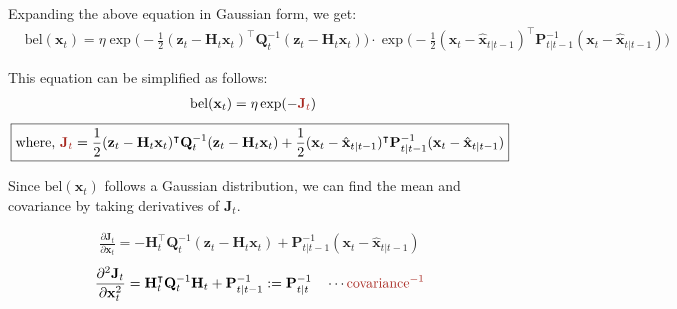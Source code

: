 \documentclass[10pt]{article}
\begin{document}
Expanding the above equation in Gaussian form, we get:
\begin{equation} 
	\begin{aligned} 
		& {\text{bel}}(\mathbf{x}_{t}) = \eta \exp \Big(-\frac{1}{2}(\mathbf{z}_t - \mathbf{H}_t\mathbf{x}_{t})^{\intercal} \mathbf{Q}_t^{-1}(\mathbf{z}_t - \mathbf{H}_t\mathbf{x}_{t}) \Big) \cdot \exp \Big( -\frac{1}{2}(\mathbf{x}_{t} - \hat{\mathbf{x}}_{t|t-1})^{\intercal} {\mathbf{P}}_{t|t-1}^{-1}(\mathbf{x}_{t} - \hat{\mathbf{x}}_{t|t-1}) \Big)
	\end{aligned} 
\end{equation}

This equation can be simplified as follows:
\begin{equation} 
	\begin{aligned} 
		& {\text{bel}}(\mathbf{x}_{t}) = \eta \exp(-{\color{Mahogany} \mathbf{J}_{t} })
	\end{aligned} 
\end{equation}
\begin{equation}
	\boxed{	\begin{aligned}
			\text{where, } {\color{Mahogany} \mathbf{J}_t } = \frac{1}{2}(\mathbf{z}_t - \mathbf{H}_t\mathbf{x}_{t})^{\intercal} \mathbf{Q}_t^{-1}(\mathbf{z}_t - \mathbf{H}_t\mathbf{x}_{t}) + \frac{1}{2}(\mathbf{x}_{t} - \hat{\mathbf{x}}_{t|t-1})^{\intercal} {\mathbf{P}}_{t|t-1}^{-1}(\mathbf{x}_{t} - \hat{\mathbf{x}}_{t|t-1})
	\end{aligned} }
\end{equation}

Since ${\text{bel}}(\mathbf{x}_{t})$ follows a Gaussian distribution, we can find the mean and covariance by taking derivatives of $\mathbf{J}_t$.

\begin{equation}
	\begin{aligned}
		\frac{\partial \mathbf{J}_t}{\partial \mathbf{x}_t}
		= -\mathbf{H}_t^{\intercal}\mathbf{Q}_t^{-1}(\mathbf{z}_t - \mathbf{H}_t\mathbf{x}_{t}) + \mathbf{P}_{t|t-1}^{-1}(\mathbf{x}_{t} - \hat{\mathbf{x}}_{t|t-1})
	\end{aligned}
\end{equation}
\begin{equation}
	\begin{aligned}
		\frac{\partial^2 \mathbf{J}_t}{\partial \mathbf{x}^2_t}
		= \mathbf{H}_t^{\intercal}\mathbf{Q}_t^{-1}\mathbf{H}_t + \mathbf{P}_{t|t-1}^{-1} := \mathbf{P}_{t|t}^{-1} \quad \cdots {\color{Mahogany} \text{covariance}^{-1} }
	\end{aligned}
\end{equation}
\end{document}
